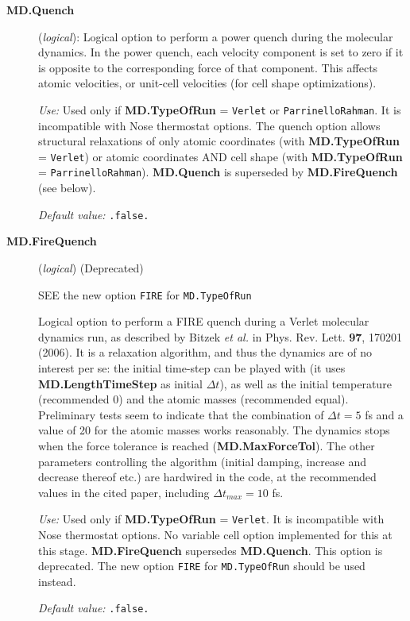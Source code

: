 \begin{description}
\item[\textbf{MD.Quench}] (\textit{logical}):
Logical option to perform a power quench during the molecular dynamics.
In the power quench, each velocity component is set to
zero if it is opposite to the corresponding force
of that component. This affects atomic velocities,
or unit-cell velocities (for cell shape optimizations).

\textit{Use:} Used only if \textbf{MD.TypeOfRun} = \texttt{Verlet} or
\texttt{ParrinelloRahman}.
It is incompatible with Nose thermostat options.
The quench option allows structural relaxations of
only atomic coordinates (with \textbf{MD.TypeOfRun} = \texttt{Verlet})
or atomic coordinates AND cell shape
(with \textbf{MD.TypeOfRun} = \texttt{ParrinelloRahman}).
\textbf{MD.Quench} is superseded by \textbf{MD.FireQuench} (see below).

\textit{Default value:} \texttt{.false.}

\item[\textbf{MD.FireQuench}] (\textit{logical}) (Deprecated)

SEE the new option \texttt{FIRE} for \texttt{MD.TypeOfRun}

Logical option to perform a FIRE quench during a Verlet molecular dynamics
run, as described by Bitzek \textit{et al.} in Phys. Rev. Lett. \textbf{97},
170201 (2006). It is a relaxation algorithm, and thus the dynamics
are of no interest per se: the initial time-step can be played with
(it uses \textbf{MD.LengthTimeStep} as initial $\Delta t$),
as well as the initial temperature (recommended 0) and the atomic
masses (recommended equal). Preliminary tests seem to indicate that
the combination of $\Delta t = 5$ fs and a value of 20 for the atomic
masses works reasonably. The dynamics stops when the force
tolerance is reached (\textbf{MD.MaxForceTol}). The other
parameters controlling the algorithm (initial damping,
increase and decrease thereof etc.) are hardwired in the code,
at the recommended values in the cited paper,
including $\Delta t_{max} = 10$ fs.

\textit{Use:} Used only if \textbf{MD.TypeOfRun} = \texttt{Verlet}.
It is incompatible with Nose thermostat options. No variable
cell option implemented for this at this stage.
\textbf{MD.FireQuench} supersedes \textbf{MD.Quench}. This option is
deprecated. The new option \texttt{FIRE} for \texttt{MD.TypeOfRun} should be
used instead.

\textit{Default value:} \texttt{.false.}

\end{description}

